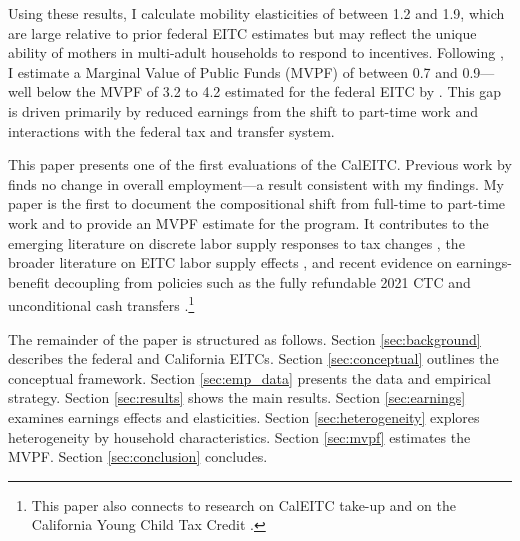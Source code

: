 \documentclass[11pt]{article}
\begin{document}
Using these results, I calculate mobility elasticities of between 1.2 and 1.9, which are large relative to prior federal EITC estimates but may reflect the unique ability of mothers in multi-adult households to respond to incentives. Following \cite{hendren_unified_2020}, I estimate a Marginal Value of Public Funds (MVPF) of between 0.7 and 0.9---well below the MVPF of 3.2 to 4.2 estimated for the federal EITC by \cite{bastian_eitc_2021}. This gap is driven primarily by reduced earnings from the shift to part-time work and interactions with the federal tax and transfer system.


This paper presents one of the first evaluations of the CalEITC. Previous work by \cite{neumark_too_2025} finds no change in overall employment---a result consistent with my findings. My paper is the first to document the compositional shift from full-time to part-time work and to provide an MVPF estimate for the program. It contributes to the emerging literature on discrete labor supply responses to tax changes \citep{kosonen_discrete_2023}, the broader literature on EITC labor supply effects \citep{eissa_labor_1996, meyer_welfare_2001, hoynes_effective_2018, bastian_rise_2020, kleven_eitc_2024}, and recent evidence on earnings-benefit decoupling from policies such as the fully refundable 2021 CTC \citep{enriquez_short-term_2023, goldin_child_2024} and unconditional cash transfers \citep{vivalt_employment_2024}.\footnote{This paper also connects to research on CalEITC take-up \citep{iselin_measuring_2023} and on the California Young Child Tax Credit \citep{goldin_child_2024, unrath_filing_2024}.}


The remainder of the paper is structured as follows. Section \ref{sec:background} describes the federal and California EITCs. Section \ref{sec:conceptual} outlines the conceptual framework. Section \ref{sec:emp_data} presents the data and empirical strategy. Section \ref{sec:results} shows the main results. Section \ref{sec:earnings} examines earnings effects and elasticities. Section \ref{sec:heterogeneity} explores heterogeneity by household characteristics. Section \ref{sec:mvpf} estimates the MVPF. Section \ref{sec:conclusion} concludes.


\end{document}
